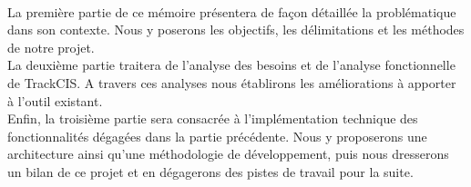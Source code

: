 	\paragraph{}
	La première partie de ce mémoire présentera de façon détaillée la problématique
	dans son contexte. Nous y poserons les objectifs, les délimitations et les
	méthodes de notre projet.\\
	La deuxième partie traitera de l'analyse des besoins et de
	l'analyse fonctionnelle de TrackCIS. A travers ces analyses nous établirons les
	améliorations à apporter à l'outil existant.\\
	Enfin, la troisième partie sera consacrée à l'implémentation technique des
	fonctionnalités dégagées dans la partie précédente. Nous y proposerons une
	architecture ainsi qu'une méthodologie de développement, puis nous dresserons
	un bilan de ce projet et en dégagerons des pistes de travail pour la suite.
